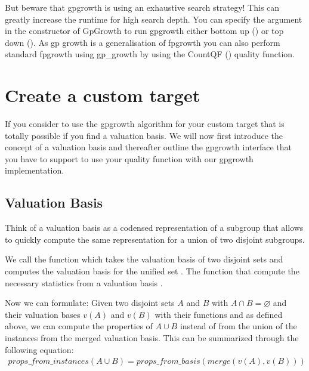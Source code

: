 \documentclass[letterpaper,10pt,english]{sphinxmanual}
\begin{document}
But beware that gp\sphinxhyphen{}growth is using an exhaustive search strategy! This can greatly increase the runtime for high search depth.
You can specify the  argument in the constructor of GpGrowth to run gp\sphinxhyphen{}growth either bottom up () or top down ().
As gp growth is a generalisation of fp\sphinxhyphen{}growth you can also perform standard fp\sphinxhyphen{}growth using gp\_growth by using the CountQF ({\hyperref[\detokenize{targets:countqf}]{}}) quality function.


\section{Create a custom target}
\label{\detokenize{gp_growth:create-a-custom-target}}
If you consider to use the gp\sphinxhyphen{}growth algorithm for your custom target that is totally possible if you find a valuation basis.
We will now first introduce the concept of a valuation basis and thereafter outline the gp\sphinxhyphen{}growth interface that you have to support to use your quality function with our gp\sphinxhyphen{}growth implementation.


\subsection{Valuation Basis}
\label{\detokenize{gp_growth:valuation-basis}}
Think of a valuation basis as a codensed representation of a subgroup that allows to quickly compute the same representation for a union of two disjoint subgroups.

We call the function which takes the valuation basis of two disjoint sets and computes the valuation basis for the unified set . The function that compute the necessary statistics from a valuation basis .

Now we can formulate: Given two disjoint sets \(A\) and \(B\) with \(A \cap B = \varnothing\) and their valuation bases \(v(A)\) and \(v(B)\) with their functions  and  as defined above, we can compute the properties of \(A \cup B\) instead of from the union of the instances from the merged valuation basis.
This can be summarized through the following equation:
\begin{equation*}
\begin{split}props\_from\_instances(A\cup B) = props\_from\_basis(merge(v(A), v(B)))\end{split}
\end{equation*}
\end{document}
